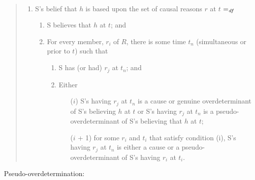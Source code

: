\paragraph*{\citeauthor{Swain:1981wd}}

\begin{note}
  \begin{quote}
    \begin{enumerate}[label=(DB)]
    \item
      S's belief that \(h\) is based upon the set of causal reasons \(r\) at \(t\) \(=_{\text{\emph{df}}}\)
      \begin{enumerate}[label=(\arabic*)]
      \item
        S believes that \(h\) at \(t\); and
      \item
        For every member, \(r_{i}\) of \(R\), there is some time \(t_{n}\) (simultaneous or prior to \(t\)) such that
        \begin{enumerate}[label=(\alph*)]
        \item
          S has (or had) \(r_{j}\) at \(t_{n}\); and
        \item
          Either
          \begin{enumerate}
          \item[(\(i\))]
            S's having \(r_{j}\) at \(t_{n}\) is a cause or genuine overdeterminant of S's believing \(h\) at \(t\) or S's having \(r_{j}\) at \(t_{n}\) is a pseudo-overdeterminant of S's believing that \(h\) at \(t\);
          \item[(\(i\) + 1)]
            for some \(r_{i}\) and \(t_{i}\) that satisfy condition (i), S's having \(r_{j}\) at \(t_{n}\) is either a cause or a pseudo-overdeterminant of S's having \(r_{i}\) at \(t_{i}\).
          \end{enumerate}
        \end{enumerate}
      \end{enumerate}
    \end{enumerate}
  \end{quote}

  Pseudo-overdetermination:


\end{note}
